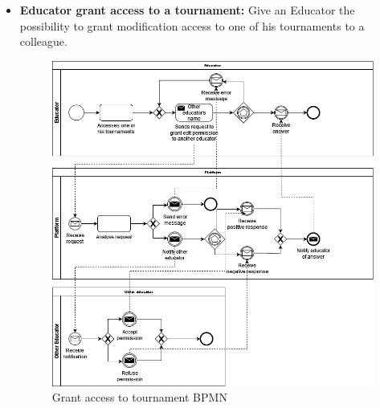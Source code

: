 \documentclass{article}
\begin{document}
{\begin{itemize}
    \item \textbf{Educator grant access to a tournament:} Give an Educator the possibility to grant modification access to one of his tournaments to a colleague.
          \begin{figure}[H]
              \centering
              \includegraphics[scale=0.4]{images/BPMN/BPMN10.png}
              \caption{Grant access to tournament BPMN}
              \label{fig:accessGrantTournamentBPMN}
          \end{figure}

          \newpage


\end{itemize}}
\end{document}

